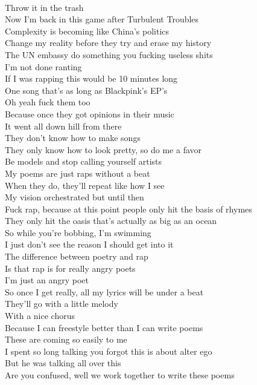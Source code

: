 \documentclass[12pt, b5paper, oneside]{book}
\begin{document}
\\Throw it in the trash 
\\Now I'm back in this game after Turbulent Troubles
%
\\Complexity is becoming like China's politics
\\Change my reality before they try and erase my history
\\The UN embassy do something you fucking useless shits
\\I'm not done ranting
\\If I was rapping this would be 10 minutes long
\\One song that's as long as Blackpink's EP's
\\Oh yeah fuck them too
\\Because once they got opinions in their music
\\It went all down hill from there
\\They don't know how to make songs
\\They only know how to look pretty, so do me a favor
\\Be models and stop calling yourself artists
\\My poems are just raps without a beat
\\When they do, they'll repeat like how I see 
\\My vision orchestrated but until then 
\\Fuck rap, because at this point people only hit the basis of rhymes
\\They only hit the oasis that's actually as big as an ocean
\\So while you're bobbing, I'm swimming
\\I just don't see the reason I should get into it
\\The difference between poetry and rap
\\Is that rap is for really angry poets
\\I'm just an angry poet
\\So once I get really, all my lyrics will be under a beat
\\They'll go with a little melody
\\With a nice chorus
\\Because I can freestyle better than I can write poems
\\These are coming so easily to me
\\I spent so long talking you forgot this is about alter ego
\\But he was talking all over this
\\Are you confused, well we work together to write these poems
\end{document}
